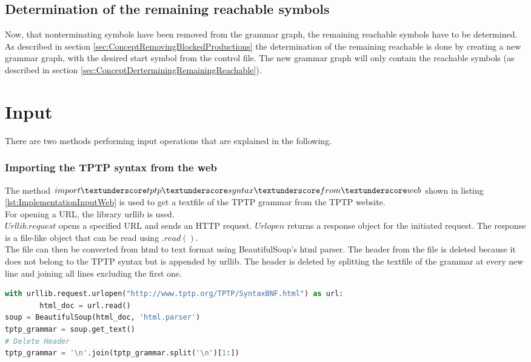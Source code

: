 \subsection{Determination of the remaining reachable symbols}

Now, that nonterminating symbols have been removed from the grammar graph, the remaining reachable symbols have to be determined.
As described in section \ref{sec:ConceptRemovingBlockedProductions} the determination of the remaining reachable is done by creating a new grammar graph, with the desired start symbol from the control file.
The new grammar graph will only contain the reachable symbols (as described in section \ref{sec:ConceptDerterminingRemainingReachable}). 

\section{Input}\label{sec:ImplementationInput}

There are two methods performing input operations that are explained in the following. 

\subsubsection{Importing the \ac{TPTP} syntax from the web}

The method $import\textunderscore tptp\textunderscore syntax\textunderscore from\textunderscore web$ shown in listing \ref{lst:ImplementationInputWeb} is used to get a textfile of the \ac{TPTP} grammar from the \ac{TPTP} website. \\
For opening a \ac{URL}, the library urllib is used. \\ $Urllib.request$ opens a specified \ac{URL} and sends an HTTP request. $Urlopen$ returns a response object for the initiated request. The response is a file-like object that can be read using $.read()$. \cite{urllib} \\
The file can then be converted from html to text format using BeautifulSoup's html parser.
The header from the file is deleted because it does not belong to the \ac{TPTP} syntax but is appended by urllib. The header is deleted by splitting the textfile of the grammar at every new line and joining all lines excluding the first one. \\

\begin{lstlisting}[language=Python, basicstyle=\scriptsize	,caption= Import TPTP syntax from web,label= lst:ImplementationInputWeb]
with urllib.request.urlopen("http://www.tptp.org/TPTP/SyntaxBNF.html") as url:
        html_doc = url.read()
soup = BeautifulSoup(html_doc, 'html.parser')
tptp_grammar = soup.get_text()
# Delete Header
tptp_grammar = '\n'.join(tptp_grammar.split('\n')[1:])
\end{lstlisting}


